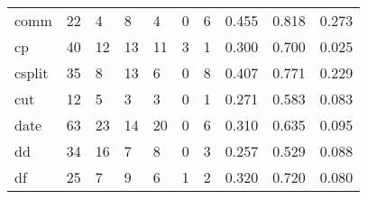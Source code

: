 \begin{longtable}{lp{1.3cm}p{1.3cm}p{1.3cm}p{1.3cm}p{1.3cm}p{1.3cm}p{1.3cm}p{1.3cm}p{1.3cm}}
comm      &                     22 &                                             4 &                                            8 &                                           4 &                                            0 &                                          6 &                                0.455 &                                  0.818 &                                0.273 \\
cp        &                     40 &                                            12 &                                           13 &                                          11 &                                            3 &                                          1 &                                0.300 &                                  0.700 &                                0.025 \\
csplit    &                     35 &                                             8 &                                           13 &                                           6 &                                            0 &                                          8 &                                0.407 &                                  0.771 &                                0.229 \\
cut       &                     12 &                                             5 &                                            3 &                                           3 &                                            0 &                                          1 &                                0.271 &                                  0.583 &                                0.083 \\
date      &                     63 &                                            23 &                                           14 &                                          20 &                                            0 &                                          6 &                                0.310 &                                  0.635 &                                0.095 \\
dd        &                     34 &                                            16 &                                            7 &                                           8 &                                            0 &                                          3 &                                0.257 &                                  0.529 &                                0.088 \\
df        &                     25 &                                             7 &                                            9 &                                           6 &                                            1 &                                          2 &                                0.320 &                                  0.720 &                                0.080 \\

\end{longtable}
